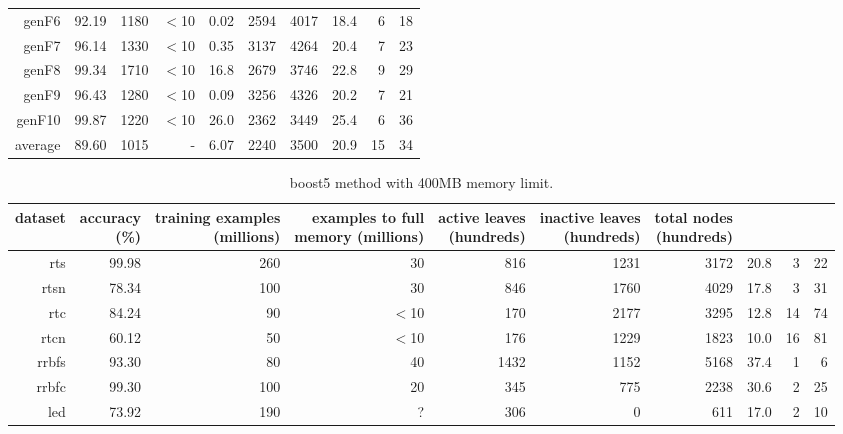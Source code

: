 \begin{table}
\begin{tabular}{|r|r|r|r|r|r|r|r|r|r|}
{\sc genF6} & 92.19 & 1180 & $<$10 & 0.02 & 2594 & 4017 & 18.4 & 6 & 18 \\
{\sc genF7} & 96.14 & 1330 & $<$10 & 0.35 & 3137 & 4264 & 20.4 & 7 & 23 \\
{\sc genF8} & 99.34 & 1710 & $<$10 & 16.8 & 2679 & 3746 & 22.8 & 9 & 29 \\
{\sc genF9} & 96.43 & 1280 & $<$10 & 0.09 & 3256 & 4326 & 20.2 & 7 & 21 \\
{\sc genF10} & 99.87 & 1220 & $<$10 & 26.0 & 2362 & 3449 & 25.4 & 6 & 36 \\
\hline
average & 89.60 & 1015 &  -  & 6.07 & 2240 & 3500 & 20.9 & 15 & 34 \\
\hline
\end{tabular}
\end{table}
\clearpage
\begin{table}
\caption{{\sc boost5} method with 400MB memory limit.}
\label{tab:boost5-400MB}
\centering
\begin{tabular}{|r|r|r|r|r|r|r|r|r|r|}
\hline
dataset	&
\rotatebox{90}{\parbox{9em}{accuracy\\(\%)}} &
\rotatebox{90}{\parbox{9em}{training examples\\(millions)}} &
\rotatebox{90}{\parbox{9em}{examples to full\\memory (millions)}} &
\rotatebox{90}{\parbox{9em}{active leaves\\(hundreds)}} &
\rotatebox{90}{\parbox{9em}{inactive leaves\\(hundreds)}} &
\rotatebox{90}{\parbox{9em}{total nodes\\(hundreds)}} &
\rotatebox{90}{\parbox{9em}{average tree depth}}	&
\rotatebox{90}{\parbox{9em}{training speed (\%)}} &
\rotatebox{90}{\parbox{9em}{prediction speed (\%)}} \\
\hline
{\sc rts} & 99.98 & 260 & 30 & 816 & 1231 & 3172 & 20.8 & 3 & 22 \\
{\sc rtsn} & 78.34 & 100 & 30 & 846 & 1760 & 4029 & 17.8 & 3 & 31 \\
{\sc rtc} & 84.24 & 90 & $<$10 & 170 & 2177 & 3295 & 12.8 & 14 & 74 \\
{\sc rtcn} & 60.12 & 50 & $<$10 & 176 & 1229 & 1823 & 10.0 & 16 & 81 \\
{\sc rrbfs} & 93.30 & 80 & 40 & 1432 & 1152 & 5168 & 37.4 & 1 & 6 \\
{\sc rrbfc} & 99.30 & 100 & 20 & 345 & 775 & 2238 & 30.6 & 2 & 25 \\
{\sc led} & 73.92 & 190 & ? & 306 & 0 & 611 & 17.0 & 2 & 10 \\

\end{tabular}
\end{table}

